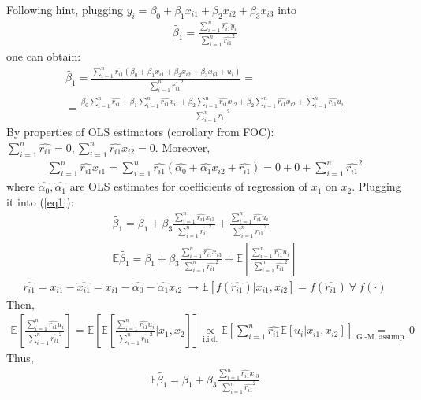 \documentclass[a4paper]{article}
\newcommand{\expect}{\mathbb{E}}
\begin{document}
Following hint, plugging $y_i = \beta_0 + \beta_1x_{i1} + \beta_2x_{i2}+\beta_3x_{i3}$ into
\begin{align*}
\tilde{\beta_1} = \frac{\sum_{i=1}^n \hat{r_{i1}}y_i}{\sum_{i=1}^n \hat{r_{i1}}^2}
\end{align*}
one can obtain:
\begin{align} \label{eq1}
\tilde{\beta_1} = \frac{\sum_{i=1}^n \hat{r_{i1}}(\beta_0 + \beta_1x_{i1} + \beta_2x_{i2}+\beta_3x_{i3} + u_i)}{\sum_{i=1}^n \hat{r_{i1}}^2} = \nonumber \\
=\frac{\beta_0 \sum_{i=1}^n \hat{r_{i1}} + \beta_1 \sum_{i=1}^n \hat{r_{i1}}x_{i1} + \beta_2 \sum_{i=1}^n \hat{r_{i1}}x_{i2} + \beta_2 \sum_{i=1}^n \hat{r_{i1}}x_{i2} + \sum_{i=1}^n \hat{r_{i1}}u_i}{\sum_{i=1}^n \hat{r_{i1}}^2}
\end{align}
By properties of OLS estimators (corollary from FOC): $\sum_{i=1}^n \hat{r_{i1}} = 0, \sum_{i=1}^n \hat{r_{i1}}x_{i2} = 0$. Moreover,
\begin{align*}
\sum_{i=1}^n \hat{r_{i1}}x_{i1} = \sum_{i=1}^n \hat{r_{i1}} (\hat{\alpha_0} + \hat{\alpha_1}x_{i2} + \hat{r_{i1}}) = 0 + 0 + \sum_{i=1}^n \hat{r_{i1}}^2
\end{align*}
where $\hat{\alpha_0}, \hat{\alpha_1}$ are OLS estimates for coefficients of regression of $x_1$ on $x_2$. Plugging it into (\ref{eq1}):
\begin{align*}
\tilde{\beta_1} = \beta_1 + \beta_3\frac{\sum_{i=1}^n\hat{r_{i1}}x_{i3}}{\sum_{i=1}^n \hat{r_{i1}}^2} + \frac{\sum_{i=1}^n \hat{r_{i1}}u_i}{\sum_{i=1}^n \hat{r_{i1}}^2}\\
\expect \tilde{\beta_1} = \beta_1 + \beta_3\frac{\sum_{i=1}^n\hat{r_{i1}}x_{i3}}{\sum_{i=1}^n \hat{r_{i1}}^2} + \expect\left[ \frac{\sum_{i=1}^n \hat{r_{i1}}u_i}{\sum_{i=1}^n \hat{r_{i1}}^2} \right]
\end{align*}
\begin{align*}
\hat{r_{i1}} = x_{i1} - \hat{x_{i1}} = x_{i1} - \hat{\alpha_0} - \hat{\alpha_1}x_{i2}\ \to \expect[f(\hat{r_{i1}})|x_{i1}, x_{i2}] = f(\hat{r_{i1}}) \ \forall\ f(\cdot)
\end{align*}
Then,
\begin{align*}
\expect\left[\frac{\sum_{i=1}^n \hat{r_{i1}}u_i}{\sum_{i=1}^n \hat{r_{i1}}^2} \right] = \expect\left[\expect\left[\frac{\sum_{i=1}^n \hat{r_{i1}}u_i}{\sum_{i=1}^n \hat{r_{i1}}^2}\bigg|x_{1}, x_{2}\right] \right] \underset{\text{i.i.d.}}{\propto} \expect\left[\sum_{i=1}^n\hat{r_{i1}}\expect [u_i|x_{i1}, x_{i2}]\right] \underset{\text{G.-M. assump.}}{=} 0 
\end{align*}
Thus, 
\begin{align*}
\expect \tilde{\beta_1} = \beta_1 + \beta_3\frac{\sum_{i=1}^n\hat{r_{i1}}x_{i3}}{\sum_{i=1}^n \hat{r_{i1}}^2}
\end{align*}
\end{document}
